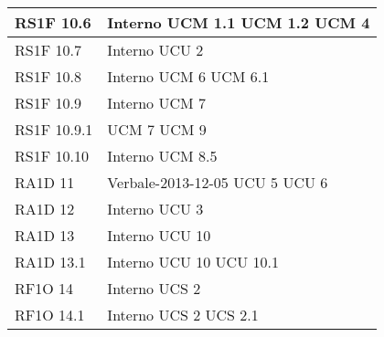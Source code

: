 \begin{center}
\begin{longtable}{ | p{5cm} | p{5cm} |}
        RS1F 10.6 &  Interno \newline  UCM 1.1 \newline  UCM 1.2 \newline  UCM 4 \newline  \\ \hline      
        RS1F 10.7 &  Interno \newline  UCU 2 \newline  \\ \hline      
        RS1F 10.8 &  Interno \newline  UCM 6 \newline  UCM 6.1 \newline  \\ \hline      
        RS1F 10.9 &  Interno \newline  UCM 7 \newline  \\ \hline      
        RS1F 10.9.1 &  UCM 7 \newline  UCM 9 \newline  \\ \hline      
        RS1F 10.10 &  Interno \newline  UCM 8.5 \newline  \\ \hline      
        RA1D 11 &  Verbale-2013-12-05 \newline  UCU 5 \newline  UCU 6 \newline  \\ \hline      
        RA1D 12 &  Interno \newline  UCU 3 \newline  \\ \hline      
        RA1D 13 &  Interno \newline  UCU 10 \newline  \\ \hline      
        RA1D 13.1 &  Interno \newline  UCU 10 \newline  UCU 10.1 \newline  \\ \hline      
        RF1O 14 &  Interno \newline  UCS 2 \newline  \\ \hline      
        RF1O 14.1 &  Interno \newline  UCS 2 \newline  UCS 2.1 \newline  \\ \hline      

\end{longtable}
\end{center}

